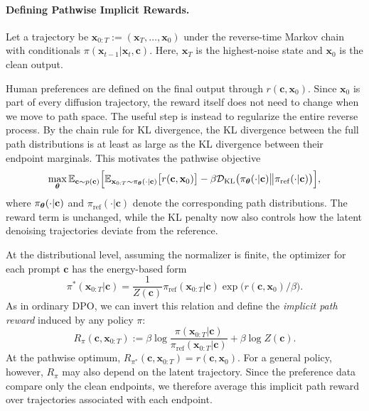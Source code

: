 \paragraph{Defining Pathwise Implicit Rewards.}
Let a trajectory be
$\mathbf x_{0:T}:=(\mathbf x_T,\ldots,\mathbf x_0)$ under the reverse-time
Markov chain with conditionals
$\pi(\mathbf x_{t-1}|\mathbf x_t,\mathbf c)$. Here, $\mathbf x_T$ is the
highest-noise state and $\mathbf x_0$ is the clean output.

Human preferences are defined on the final output through
$r(\mathbf c,\mathbf x_0)$. Since $\mathbf x_0$ is part of every diffusion
trajectory, the reward itself does not need to change when we move to path
space. The useful step is instead to regularize the entire reverse process.
By the chain rule for KL divergence, the KL divergence between the full path
distributions is at least as large as the KL divergence between their endpoint
marginals. This motivates the pathwise objective
\[
\max_{{\bm{\theta}}}\mathbb E_{\mathbf c\sim p(\mathbf c)}
\Big[
\mathbb E_{\mathbf x_{0:T}\sim\pi_{{\bm{\theta}}}(\cdot|\mathbf c)}
\big[r(\mathbf c,\mathbf x_0)\big]
-\beta
\mathcal D_{\mathrm{KL}}
\big(
\pi_{{\bm{\theta}}}(\cdot|\mathbf c)
\big\|
\pi_{\mathrm{ref}}(\cdot|\mathbf c)
\big)
\Big],
\]
where $\pi_{{\bm{\theta}}}(\cdot|\mathbf c)$ and
$\pi_{\mathrm{ref}}(\cdot|\mathbf c)$ denote the corresponding path
distributions. The reward term is unchanged, while the KL penalty now also
controls how the latent denoising trajectories deviate from the reference.

At the distributional level, assuming the normalizer is finite, the optimizer
for each prompt $\mathbf c$ has the energy-based form
\begin{equation}\label{eq:path-closed-form}
\pi^*(\mathbf x_{0:T}|\mathbf c)
=
\frac{1}{Z(\mathbf c)}
\pi_{\mathrm{ref}}(\mathbf x_{0:T}|\mathbf c)
\exp\big(r(\mathbf c,\mathbf x_0)/\beta\big).
\end{equation}
As in ordinary DPO, we can invert this relation and define the
\emph{implicit path reward} induced by any policy $\pi$:
\[
R_{\pi}(\mathbf c,\mathbf x_{0:T})
:=
\beta\log
\frac{\pi(\mathbf x_{0:T}|\mathbf c)}
{\pi_{\mathrm{ref}}(\mathbf x_{0:T}|\mathbf c)}
+\beta\log Z(\mathbf c).
\]
At the pathwise optimum,
$R_{\pi^*}(\mathbf c,\mathbf x_{0:T})=r(\mathbf c,\mathbf x_0)$.
For a general policy, however, $R_{\pi}$ may also depend on the latent
trajectory. Since the preference data compare only the clean endpoints, we
therefore average this implicit path reward over trajectories associated with
each endpoint.


